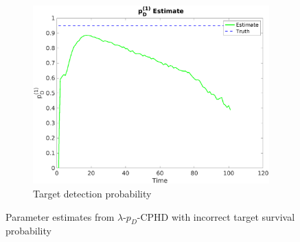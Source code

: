 \documentclass{article}
\begin{document}
\begin{figure}[H]
\begin{subfigure}[t]{0.32\textwidth}
    \centering
    \includegraphics[width=1\linewidth]{high_ps/pd1_hat.png}
    \caption{Target detection probability}
  \end{subfigure}  
  \caption{Parameter estimates from $\lambda$-$p_D$-CPHD with incorrect target survival probability}
  \label{fig:high_ps_param_est}
\end{figure}
\end{document}
